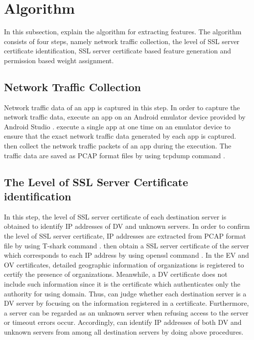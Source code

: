 \section{Algorithm}
In this subsection, \we explain the algorithm for extracting \our features.
The algorithm consists of four steps, namely network traffic collection, the level of SSL server certificate identification, SSL server certificate based feature generation and permission based weight assignment.

\subsection{Network Traffic Collection} 
Network traffic data of an app is captured in this step.  
In order to capture the network traffic data, \we execute an app on an Android emulator device provided by Android Studio \cite{studio2016official}.
\We execute a single app at one time on an emulator device to ensure that the exact network traffic data generated by each app is captured. 
\We then collect the network traffic packets of an app during the execution.
The traffic data are saved as PCAP format files by using tcpdump command \cite{jacobson1989tcpdump}.

\subsection{The Level of SSL Server Certificate identification} 
In this step, the level of SSL server certificate of each destination server is obtained to identify IP addresses of DV and unknown servers.
In order to confirm the level of SSL server certificate, IP addresses are extracted from PCAP format file by using T-shark command \cite{combs2017tshark}.  
\We then obtain a SSL server certificate of the server which corresponds to each IP address by using openssl command \cite{openssl}.  
In the EV and OV certificates, detailed geographic information of organizations is registered to certify the presence of organizations.
Meanwhile, a DV certificate does not include such information since it is the certificate which authenticates only the authority for using domain.
Thus, \we can judge whether each destination server is a DV server by focusing on the information registered in a certificate.  
Furthermore, a server can be regarded as an unknown server when refusing access to the server or timeout errors occur.
Accordingly, \we can identify IP addresses of both DV and unknown servers from among all destination servers by doing above procedures.


